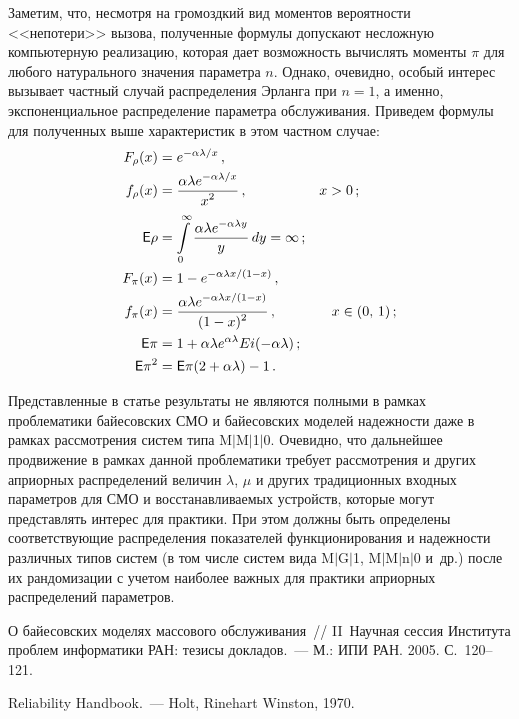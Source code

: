 \begin{multicols}{2}
Заметим, что, несмотря на громоздкий вид момен\-тов вероятности <<непотери>> вызова, по\-лу\-чен\-ные формулы допускают
несложную компьютерную реализацию, которая дает возможность %
вычис\-лять моменты $\pi$ для любого натурального значения
параметра $n$. Однако, очевидно, особый интерес вызывает частный случай распределения Эрланга при $n=1$, а именно,
экспоненциальное распределение параметра обслуживания. Приведем формулы для полученных выше характеристик в этом
частном случае:
\begin{align*}
F_\rho(x)&=e^{-\alpha\lambda /x}\,, \\ 
f_\rho(x)&=\displaystyle\frac{\displaystyle \alpha\lambda e^{-\alpha\lambda / x}\mathstrut}{\displaystyle x^2\mathstrut}\,,& x>0\,;\ \ \ \ \ \ \ \ \\
{\sf E}\rho  &=\int\limits_{0}^{\infty}\displaystyle\frac{\displaystyle \alpha\lambda e^{-\alpha\lambda y}\mathstrut}{\displaystyle y\mathstrut}\, dy=\infty\,;\\ 
F_\pi(x) &=1-e^{-\alpha\lambda x /(1-x)}\,,\\
f_\pi(x)&=\displaystyle\frac{\displaystyle \alpha\lambda e^{-\alpha\lambda x /(1-x)}\mathstrut}{\displaystyle (1-x)^2\mathstrut}\,,& x\in(0,\,1)\,;\\
{\sf E}\pi &=1+\alpha\lambda e^{\alpha\lambda} Ei(-\alpha\lambda)\,;\\ 
{\sf E}\pi^2&={\sf E}\pi(2+\alpha\lambda)-1\,.
\end{align*}

Представленные в статье результаты не являются полными в рамках проблематики байесовских СМО и байесовских моделей
надежности даже в рамках рассмотрения систем типа M$\vert$M$\vert$1$\vert$0. Очевидно, что дальнейшее продвижение в рамках
данной проблематики требует рассмотрения и других априорных распределений величин $\lambda$, $\mu$ и других
традиционных входных параметров для СМО и восстанавливаемых устройств, которые могут представлять интерес для практики.
При этом должны быть определены соответствующие распределения показателей функционирования и надежности различных типов систем (в том
числе систем вида M$\vert$G$\vert$1, M$\vert$M$\vert$n$\vert$0 и~др.) после их рандомизации с учетом наиболее важных для практики априорных
распределений параметров.

{\small\frenchspacing
{%
\begin{thebibliography}{9}
О байесовских моделях массового обслуживания~// 
II~Научная сессия Института проблем информатики РАН: тезисы докладов.~---  
М.: ИПИ РАН. 2005. С.~120--121.

Reliability Handbook.~---  Holt, Rinehart  Winston, 1970.


\end{thebibliography}}}
\end{multicols}
